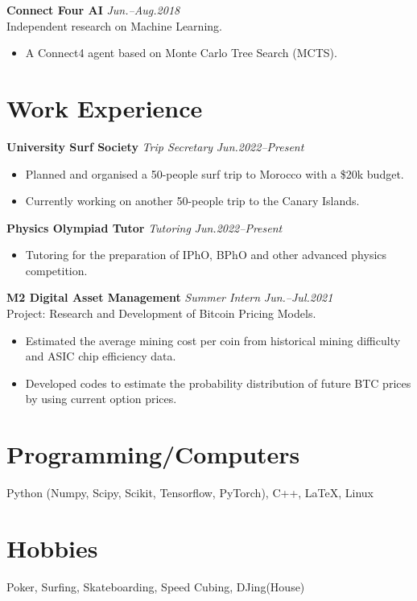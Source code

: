 \documentclass[11pt,a4paper,roman]{moderncv}        %
\begin{document}
\textbf{Connect Four AI} \hfill \textit{Jun.--Aug.2018} 
\vspace*{1mm}\\
{Independent research on Machine Learning.}
\vspace*{1mm}
\begin{itemize}
	\item A Connect4 agent based on Monte Carlo Tree Search (MCTS).
\end{itemize}

\section{Work Experience}

\textbf{University Surf Society} \textit{Trip Secretary} \hfill \textit{Jun.2022--Present}
\vspace*{1mm}
\begin{itemize}
	\item Planned and organised a 50-people surf trip to Morocco with a \$20k budget.
	\item Currently working on another 50-people trip to the Canary Islands.\\
\end{itemize}

\textbf{Physics Olympiad Tutor} \textit{Tutoring} \hfill \textit{Jun.2022--Present}
\vspace*{1mm}
\begin{itemize}
	\item Tutoring for the preparation of IPhO, BPhO and other advanced physics competition.\\
\end{itemize}

\textbf{M2 Digital Asset Management} \textit{Summer Intern} \hfill \textit{Jun.--Jul.2021}
\vspace*{1mm}\\
{Project: Research and Development of Bitcoin Pricing Models.}
\vspace*{1mm}
\begin{itemize}
	\item Estimated the average mining cost per coin from historical mining difficulty and ASIC chip efficiency data.
	\item Developed codes to estimate the probability distribution of future BTC prices by using current option prices.
\end{itemize}

\section{Programming/Computers}
{Python (Numpy, Scipy, Scikit, Tensorflow, PyTorch), C++, \LaTeX, Linux}

\section{Hobbies}
{Poker, Surfing, Skateboarding, Speed Cubing, DJing(House)}
\end{document}
